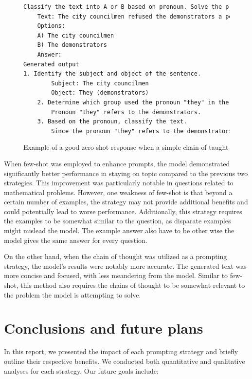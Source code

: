 \documentclass[fleqn,moreauthors,10pt]{ds_report}
\begin{document}
\begin{figure}[htbp]
\centering
\begin{lstlisting}[language=TeX]
Classify the text into A or B based on pronoun. Solve the problem step by step please
    Text: The city councilmen refused the demonstrators a permit because they advocated violence.
    Options:
    A) The city councilmen
    B) The demonstrators
    Answer:
Generated output
1. Identify the subject and object of the sentence.
        Subject: The city councilmen
        Object: They (demonstrators)
    2. Determine which group used the pronoun "they" in the sentence.
        Pronoun "they" refers to the demonstrators.
    3. Based on the pronoun, classify the text.
        Since the pronoun "they" refers to the demonstrators, the text should be classified as B.
\end{lstlisting}
\caption{Example of a good zero-shot response when a simple chain-of-taught}
\label{text:zeroshotGood}
\end{figure}

When few-shot was employed to enhance prompts, the model demonstrated significantly better performance in staying on topic compared to the previous two strategies. This improvement was particularly notable in questions related to mathematical problems. However, one weakness of few-shot is that beyond a certain number of examples, the strategy may not provide additional benefits and could potentially lead to worse performance. Additionally, this strategy requires the examples to be somewhat similar to the question, as disparate examples might mislead the model. The example answer also have to be other wise the model gives the same answer for every question.

On the other hand, when the chain of thought was utilized as a prompting strategy, the model's results were notably more accurate. The generated text was more concise and focused, with less meandering from the model. Similar to few-shot, this method also requires the chains of thought to be somewhat relevant to the problem the model is attempting to solve.

\section*{Conclusions and future plans}

In this report, we presented the impact of each prompting strategy and briefly outline their respective benefits. We conducted both quantitative and qualitative analyses for each strategy. Our future goals include:
\end{document}
